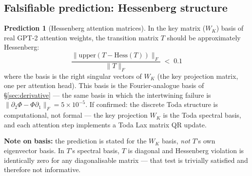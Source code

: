 \documentclass[11pt]{amsart}
\theoremstyle{definition}
\newtheorem{prediction}[theorem]{Prediction}
\begin{document}
\subsection{Falsifiable prediction: Hessenberg structure}

\begin{prediction}[Hessenberg attention matrices]
\label{pred:hessenberg}
In the key matrix ($W_K$) basis of real GPT-2 attention weights,
the transition matrix $T$ should be approximately Hessenberg:
\[
  \frac{\|\mathrm{upper}(T - \mathrm{Hess}(T))\|_F}{\|T\|_F} \;<\; 0.1
\]
where the basis is the right singular vectors of $W_K$
(the key projection matrix, one per attention head).
This basis is the Fourier-analogue basis of \S\ref{sec:derivative}
--- the same basis in which the intertwining failure is
$\|\partial_2\Phi - \Phi\partial_1\|_F = 5\times10^{-5}$.
If confirmed: the discrete Toda structure is computational,
not formal --- the key projection $W_K$ is the Toda spectral basis,
and each attention step implements a Toda Lax matrix QR update.

\textbf{Note on basis:} the prediction is stated for the $W_K$ basis,
\emph{not} $T$'s own eigenvector basis.
In $T$'s spectral basis, $T$ is diagonal and Hessenberg violation
is identically zero for any diagonalisable matrix --- that test
is trivially satisfied and therefore not informative.
\end{prediction}
\end{document}
